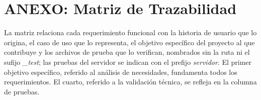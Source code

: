 \chapter[Anexo: Matriz de Trazabilidad]{ANEXO: Matriz de Trazabilidad}

La matriz relaciona cada requerimiento funcional con la historia de usuario que
lo origina, el caso de uso que lo representa, el objetivo específico del
proyecto al que contribuye y los archivos de prueba que lo verifican, nombrados
sin la ruta ni el sufijo \emph{\_test}; las pruebas del servidor se indican con el prefijo \emph{servidor}. El primer
objetivo específico, referido al análisis de necesidades, fundamenta todos los
requerimientos. El cuarto, referido a la validación técnica, se refleja en la
columna de pruebas.

